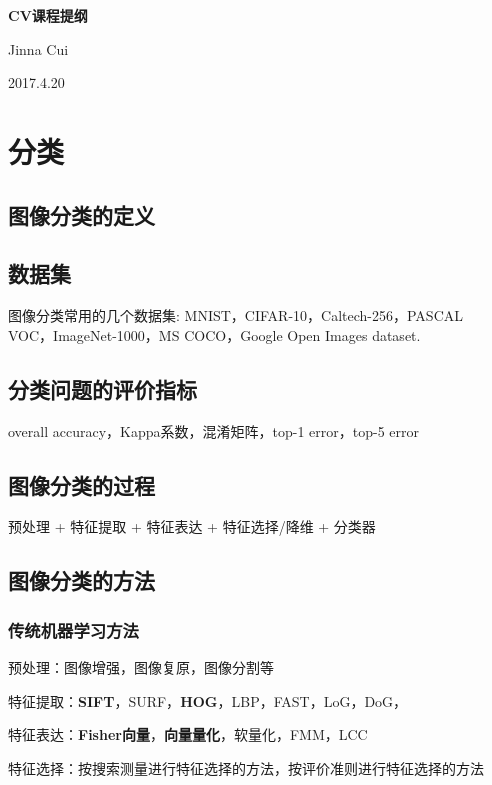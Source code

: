 \documentclass[UTF8]{article}
\begin{document}

\begin{center}
\textbf{\LARGE{CV课程提纲}} %
\end{center}

\begin{center}
Jinna Cui
\end{center}

\begin{center}
2017.4.20
\end{center}
\section{分类}
\subsection{图像分类的定义}
\subsection{数据集}
图像分类常用的几个数据集: MNIST，CIFAR-10，Caltech-256，PASCAL VOC，ImageNet-1000，MS COCO，Google Open Images dataset. 
\subsection{分类问题的评价指标}
overall accuracy，Kappa系数，混淆矩阵，top-1 error，top-5 error
\subsection{图像分类的过程}
预处理 + 特征提取 + 特征表达 + 特征选择/降维 + 分类器
\subsection{图像分类的方法}
\subsubsection{传统机器学习方法}
预处理：图像增强，图像复原，图像分割等

特征提取：\textbf{SIFT}，SURF，\textbf{HOG}，LBP，FAST，LoG，DoG，

特征表达：\textbf{Fisher向量}，\textbf{向量量化}，软量化，FMM，LCC

特征选择：按搜索测量进行特征选择的方法，按评价准则进行特征选择的方法
\end{document}
